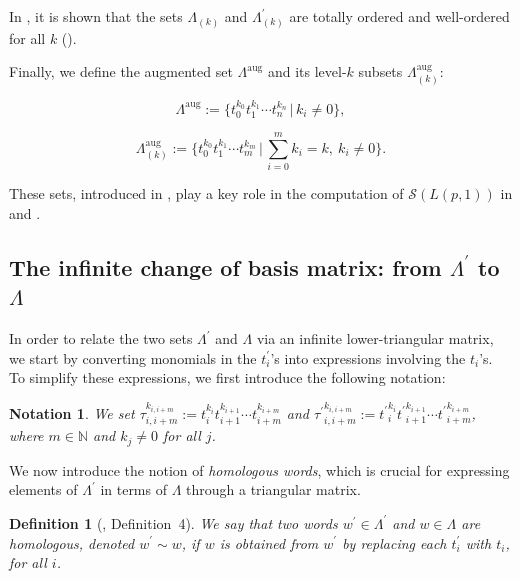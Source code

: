 \documentclass[11pt]{amsart}
\newtheorem{defn}{Definition}
\newtheorem{nt}{Notation}
\begin{document}
\noindent In \cite{DL2}, it is shown that the sets \(\Lambda_{(k)}\) and \(\Lambda^{\prime}_{(k)}\) are totally ordered and well-ordered for all \(k\) (\cite[Propositions~1 \& 2]{DL2}).

\bigbreak

Finally, we define the augmented set \(\Lambda^{\text{aug}}\) and its level-\(k\) subsets \(\Lambda^{\text{aug}}_{(k)}\):

\begin{equation}\label{lamaug}
\Lambda^{\text{aug}} := \bigl\{t_0^{k_0} t_1^{k_1} \cdots t_n^{k_n} \,\big|\, k_i \neq 0 \bigr\},
\end{equation}

\begin{equation}\label{lamaug2}
\Lambda^{\text{aug}}_{(k)} := \bigl\{t_0^{k_0} t_1^{k_1} \cdots t_m^{k_m} \,\big|\, \sum_{i=0}^m k_i = k,\ k_i \neq 0 \bigr\}.
\end{equation}

These sets, introduced in \cite{DLP}, play a key role in the computation of \(\mathcal{S}(L(p,1))\) in \cite{DL4} and \cite{D1}.


\subsection{The infinite change of basis matrix: from \(\Lambda^{\prime}\) to \(\Lambda\)}

In order to relate the two sets \(\Lambda^{\prime}\) and \(\Lambda\) via an infinite lower-triangular matrix, we start by converting monomials in the \(t^{\prime}_i\)'s into expressions involving the \(t_i\)'s. To simplify these expressions, we first introduce the following notation:

\begin{nt}\label{nt} \rm
We set \(\tau_{i,i+m}^{k_{i,i+m}} := t_i^{k_i} t_{i+1}^{k_{i+1}} \cdots t_{i+m}^{k_{i+m}}\) and \({\tau^{\prime}}_{i,i+m}^{k_{i,i+m}} := {t^{\prime}}_i^{k_i} {t^{\prime}}_{i+1}^{k_{i+1}} \cdots {t^{\prime}}_{i+m}^{k_{i+m}}\), where \(m \in \mathbb{N}\) and \(k_j \neq 0\) for all \(j\).
\end{nt}

We now introduce the notion of \textit{homologous words}, which is crucial for expressing elements of \(\Lambda^{\prime}\) in terms of \(\Lambda\) through a triangular matrix.

\begin{defn}[\cite{DL2}, Definition~4] \rm
We say that two words \(w^{\prime} \in \Lambda^{\prime}\) and \(w \in \Lambda\) are \textit{homologous}, denoted \(w^{\prime} \sim w\), if \(w\) is obtained from \(w^{\prime}\) by replacing each \(t^{\prime}_i\) with \(t_i\), for all \(i\).
\end{defn}
\end{document}
